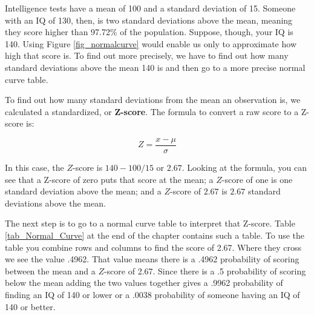\documentclass[11pt,openany]{book}\usepackage[]{graphicx}\usepackage[]{color}
\begin{document}
{Intelligence tests have a mean of 100 and a standard deviation of 15.  Someone with an IQ of 130, then, is two standard deviations above the mean, meaning they score higher than 97.72\% of the population.  Suppose, though, your IQ is 140.  Using Figure \ref{fig_normalcurve} would enable us only to approximate how high that score is.  To find out more precisely, we have to find out how many standard deviations above the mean 140 is and then go to a more precise normal curve table.

To find out how many standard deviations from the mean an observation is, we calculated a standardized, or \textbf{Z-score}.  The formula to convert a raw score to a Z-score is:

\begin{equation}
  \label{eq_label4}
Z = \frac{x-\mu}{\sigma}
\end{equation}

In this case, the $Z$-score is $140-100/15$ or $2.67$.  Looking at the formula, you can see that a Z-score of zero puts that score at the mean; a $Z$-score of one is one standard deviation above the mean; and a $Z$-score of $2.67$ is $2.67$ standard deviations above the mean.

The next step is to go to a normal curve table to interpret that Z-score.  Table \ref{tab_Normal_Curve} at the end of the chapter contains such a table.  To use the table you combine rows and columns to find the score of 2.67.  Where they cross we see the value .4962.  That value means there is a .4962 probability of scoring between the mean and a $Z$-score of 2.67.  Since there is a .5 probability of scoring below the mean adding the two values together gives a .9962 probability of finding an IQ of 140 or lower or a .0038 probability of someone having an IQ of 140 or better.

\begin{grbox}
\end{grbox}}
\end{document}
